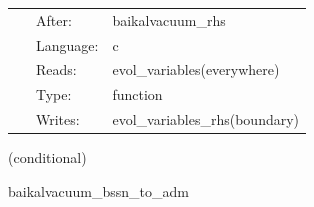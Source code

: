 \hspace{5mm}{\it newrad boundary conditions, scheduled right after rhs eval. } 


\hspace{5mm}

 \begin{tabular*}{160mm}{cll} 
~ & After:  & baikalvacuum\_rhs \\ 
~ & Language:  & c \\ 
~ & Reads:  & evol\_variables(everywhere) \\ 
~ & Type:  & function \\ 
~ & Writes:  & evol\_variables\_rhs(boundary) \\ 
\end{tabular*} 


\vspace{5mm}

   (conditional) 

\hspace{5mm} baikalvacuum\_bssn\_to\_adm 

\hspace{5mm}{\it perform bssn-to-adm conversion. useful for diagnostics. } 


\hspace{5mm}

